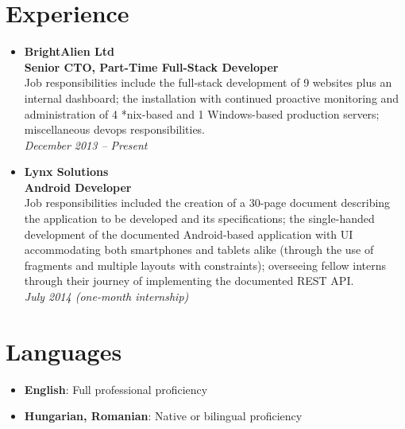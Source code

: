 \documentclass[11pt,a4paper]{article}
\begin{document}
\section{Experience}
	\begin{itemize}
	\item	{\large\textbf{BrightAlien Ltd}}\\
			\textbf{Senior CTO, Part-Time Full-Stack Developer}\\
			Job responsibilities include the full-stack development of 9 websites plus an internal dashboard; the installation with continued proactive monitoring and administration of 4 *nix-based and 1 Windows-based production servers; miscellaneous devops responsibilities.\\
			\textit{December 2013 – Present}
	\item	{\large\textbf{Lynx Solutions}}\\
			\textbf{Android Developer}\\
			Job responsibilities included the creation of a 30-page document describing the application to be developed and its specifications; the single-handed development of the documented Android-based application with UI accommodating both smartphones and tablets alike (through the use of fragments and multiple layouts with constraints); overseeing fellow interns through their journey of implementing the documented REST API.\\
			\textit{July 2014 (one-month internship)}
	\end{itemize}

\section{Languages}
	\begin{itemize}
		\item	{\large\textbf{English}}: Full professional proficiency
		\item	{\large\textbf{Hungarian, Romanian}}: Native or bilingual proficiency
	\end{itemize}

\newpage
\end{document}
